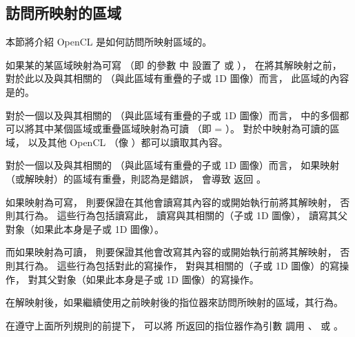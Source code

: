\subsection{訪問所映射的區域}

本節將介紹 OpenCL 是如何訪問所映射區域的。

如果某的某區域映射為可寫
（即  的參數  中
設置了  或  ），
在將其解映射之前，
對於此以及與其相關的
（與此區域有重疊的子或 1D 圖像）而言，
此區域的內容是的。

對於一個以及與其相關的
（與此區域有重疊的子或 1D 圖像）而言，
中的多個都可以將其中某個區域或重疊區域映射為可讀
（即  = ）。
對於中映射為可讀的區域，
以及其他 OpenCL （像 ）都可以讀取其內容。

對於一個以及與其相關的
（與此區域有重疊的子或 1D 圖像）而言，
如果映射（或解映射）的區域有重疊，則認為是錯誤，
會導致  返回 。

如果映射為可寫，
則要保證在其他會讀寫其內容的或開始執行前將其解映射，
否則其行為。
這些行為包括讀寫此，
讀寫與其相關的（子或 1D 圖像），
讀寫其父對象（如果此本身是子或 1D 圖像）。

而如果映射為可讀，
則要保證其他會改寫其內容的或開始執行前將其解映射，
否則其行為。
這些行為包括對此的寫操作，
對與其相關的（子或 1D 圖像）的寫操作，
對其父對象（如果此本身是子或 1D 圖像）的寫操作。

在解映射後，如果繼續使用之前映射後的指位器來訪問所映射的區域，其行為。

在遵守上面所列規則的前提下，
可以將  所返回的指位器作為引數  調用
、
或 。
